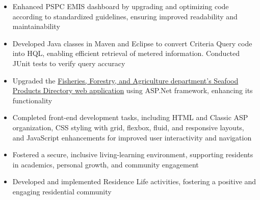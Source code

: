 \documentclass[9.5pt,a4paper]{altacv}
\begin{document}
\divider


\begin{itemize}
\item Enhanced PSPC EMIS dashboard by upgrading and optimizing code according to standardized guidelines, ensuring improved readability and maintainability
\item Developed Java classes in Maven and Eclipse to convert Criteria Query code into HQL, enabling efficient retrieval of metered information. Conducted JUnit tests to verify query accuracy

\end{itemize}

\divider


\begin{itemize}
\item Upgraded the \href{https://www.geosurv.gov.nl.ca/fishaq/directory/}{Fisheries, Forestry, and Agriculture department's Seafood Products Directory web application} using ASP.Net framework, enhancing its functionality
\item Completed front-end development tasks, including HTML and Classic ASP organization, CSS styling with grid, flexbox, fluid, and responsive layouts, and JavaScript enhancements for improved user interactivity and navigation

\end{itemize}

\divider

\begin{itemize}
\item Fostered a secure, inclusive living-learning environment, supporting residents in academics, personal growth, and community engagement
\item Developed and implemented Residence Life activities, fostering a positive and engaging residential community
\end{itemize}

\medskip



\end{document}
